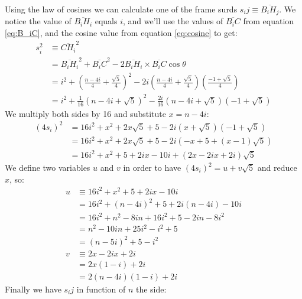 \documentclass[11pt]{article}
\begin{document}
Using the law of cosines we can calculate one of the frame surds $s_ij \equiv \overline{B_iH_j}$.
We notice the value of $\overline{B_iH_i}$ equals $i$, and we'll use the values of $\overline{B_iC}$ from equation \ref{eq:B_iC}, and the cosine value from equation \ref{eq:cosine} to get:
\begin{align}
s_i^2 &\equiv \overline{CH_i}^2 \\
 &= \overline{B_iH_i}^2 + \overline{B_iC}^2
 - 2\overline{B_iH_i}\times\overline{B_iC}\cos\theta  \nonumber\\
  &= i^2 + \left(\frac{n-4i}{4} + \frac{\sqrt{5}}{4}\right)^2
   - 2i\left(\frac{n-4i}{4} + \frac{\sqrt{5}}{4}\right)\left(\frac{-1+\sqrt{5}}{4}\right) \\
  &= i^2 + \frac{1}{16}\left(n-4i + \sqrt{5}\right)^2
   - \frac{2i}{16}\left(n-4i + \sqrt{5}\right)\left(-1+\sqrt{5}\right)
\end{align}   
We multiply both sides by 16 and substitute $x = n - 4i$:   
\begin{align}
(4s_i)^2 &= 16i^2 + x^2 + 2x\sqrt{5} + 5 - 2i\left(x + \sqrt{5}\right)\left(-1+\sqrt{5}\right) \\
 &= 16i^2 + x^2 + 2x\sqrt{5} + 5 - 2i(-x + 5 + (x-1)\sqrt{5}) \\
 &= 16i^2 + x^2 + 5 + 2ix - 10i + (2x - 2ix + 2i)\sqrt{5}
\end{align}
We define two variables $u$ and $v$ in order to have $(4s_i)^2 = u+v\sqrt{5}$ and reduce $x$, so:
\begin{align}
u &\equiv 16i^2 + x^2 + 5 + 2ix - 10i \nonumber\\
 &= 16i^2 + (n - 4i)^2 + 5 + 2i(n - 4i) - 10i \nonumber\\
 &= 16i^2 + n^2 - 8in + 16i^2 + 5 - 2in - 8i^2 \nonumber\\
 &= n^2 - 10in + 25i^2 - i^2 + 5 \nonumber\\
 &= (n - 5i)^2 + 5 - i^2 \\
v &\equiv 2x - 2ix + 2i \nonumber\\
 &= 2x(1 - i) + 2i \nonumber\\
 &= 2(n - 4i)(1 - i) + 2i
\end{align}
Finally we have $s_ij$ in function of $n$ the side:
\end{document}
